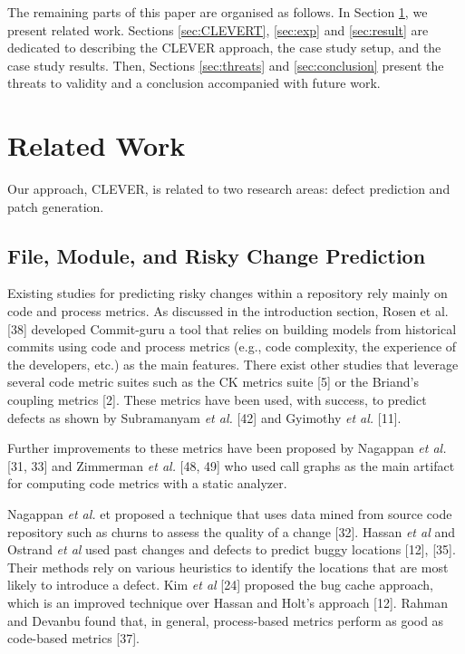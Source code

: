 \documentclass[sigconf]{acmart}
\begin{document}
The remaining parts of this paper are organised as follows. In Section
\ref{sec:relwork}, we present related work. Sections \ref{sec:CLEVERT},
\ref{sec:exp} and \ref{sec:result} are dedicated to describing the
CLEVER approach, the case study setup, and the case study results. Then,
Sections \ref{sec:threats} and \ref{sec:conclusion} present the threats
to validity and a conclusion accompanied with future work.

\section{Related Work}\label{sec:relwork}

Our approach, CLEVER, is related to two research areas: defect
prediction and patch generation.

\subsection{File, Module, and Risky Change
Prediction}\label{file-module-and-risky-change-prediction}

Existing studies for predicting risky changes within a repository rely
mainly on code and process metrics. As discussed in the introduction
section, Rosen et al. [38] developed Commit-guru a tool that relies
on building models from historical commits using code and process
metrics (e.g., code complexity, the experience of the developers, etc.)
as the main features. There exist other studies that leverage several
code metric suites such as the CK metrics suite [5] or the Briand's
coupling metrics [2]. These metrics have been used, with success, to
predict defects as shown by Subramanyam \emph{et al.} [42] and
Gyimothy \emph{et al.} [11].

Further improvements to these metrics have been proposed by Nagappan
\emph{et al.} [31, 33] and Zimmerman \emph{et al.} [48, 49] who
used call graphs as the main artifact for computing code metrics with a
static analyzer.

Nagappan \emph{et al.} et proposed a technique that uses data mined from
source code repository such as churns to assess the quality of a change
[32]. Hassan \emph{et al} and Ostrand \emph{et al} used past changes
and defects to predict buggy locations [12], [35]. Their methods
rely on various heuristics to identify the locations that are most
likely to introduce a defect. Kim \emph{et al} [24] proposed the bug
cache approach, which is an improved technique over Hassan and Holt's
approach [12]. Rahman and Devanbu found that, in general,
process-based metrics perform as good as code-based metrics [37].
\end{document}
